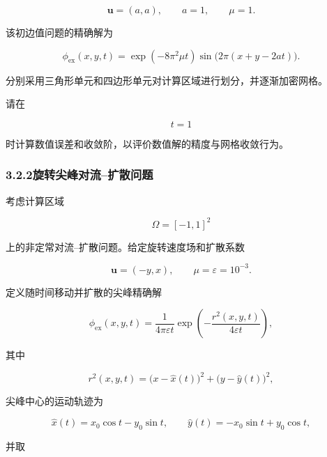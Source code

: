 \documentclass[UTF8,12pt,a4paper,fontset=fandol]{ctexart}
\begin{document}
\begin{equation}
\bm{u}=(a,a),
\qquad
a=1,
\qquad
\mu=1.
\end{equation}

该初边值问题的精确解为

\begin{equation}
\phi_{\mathrm{ex}}(x,y,t)
=\exp\left(-8\pi^2\mu t\right)
\sin\bigl(2\pi(x+y-2at)\bigr).
\end{equation}

分别采用三角形单元和四边形单元对计算区域进行划分，并逐渐加密网格。

请在

\begin{equation}
t=1
\end{equation}

时计算数值误差和收敛阶，以评价数值解的精度与网格收敛行为。

\subsubsection{3.2.2\quad 旋转尖峰对流--扩散问题}

考虑计算区域

\begin{equation}
\Omega=[-1,1]^2
\end{equation}

上的非定常对流--扩散问题。给定旋转速度场和扩散系数

\begin{equation}
\bm{u}=(-y,x),
\qquad
\mu=\varepsilon=10^{-3}.
\end{equation}

定义随时间移动并扩散的尖峰精确解

\begin{equation}
\phi_{\mathrm{ex}}(x,y,t)
=\frac{1}{4\pi\varepsilon t}
\exp\left(-\frac{r^2(x,y,t)}{4\varepsilon t}\right),
\end{equation}

其中

\begin{equation}
r^2(x,y,t)
=\bigl(x-\widehat{x}(t)\bigr)^2
+\bigl(y-\widehat{y}(t)\bigr)^2,
\end{equation}

尖峰中心的运动轨迹为

\begin{equation}
\widehat{x}(t)=x_0\cos t-y_0\sin t,
\qquad
\widehat{y}(t)=-x_0\sin t+y_0\cos t,
\end{equation}

并取
\end{document}
